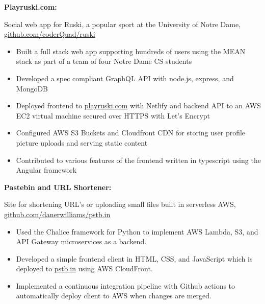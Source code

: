 \documentclass[letterpaper,10pt]{article}
\newcommand{\resumeItem}[2]{
  \item\small{
    {#1}{#2 \vspace{-2pt}}
  }
}
\newcommand{\resumeSubItem}[2]{\resumeItem{#1}{#2}\vspace{-4pt}}
\begin{document}
{     \resumeSubItem{\textbf{Playruski.com: }}
     { Social web app for Ruski, a popular sport at the University of Notre Dame, \href{https://github.com/coderQuad/ruski}{github.com/coderQuad/ruski}
        \vspace{-5pt}
        \begin{itemize}
            \item Built a full stack web app supporting hundreds of users using the MEAN stack as part of a team of four Notre Dame CS students
            \vspace{-2pt}
            \item Developed a spec compliant GraphQL API with node.js, express, and MongoDB
            \vspace{-2pt}
            \item Deployed frontend to \href{https://www.playruski.com}{playruski.com} with Netlify and backend API to an AWS EC2 virtual machine secured over HTTPS with Let's Encrypt
            \vspace{-2pt}
            \item Configured AWS S3 Buckets and Cloudfront CDN for storing user profile picture uploads and serving static content
            \vspace{-2pt}
            \item Contributed to various features of the frontend written in typescript using the Angular framework
        \end{itemize}
     } 

     \vspace{-2pt}

      \resumeSubItem{\textbf{Pastebin and URL Shortener: }}
      { Site for shortening URL's or uploading small files built in serverless AWS, \href{https://github.com/danerwilliams/pstb.in}{github.com/danerwilliams/pstb.in}
         \vspace{-5pt}
         \begin{itemize}
            \item Used the Chalice framework for Python to implement AWS Lambda, S3, and API Gateway microservices as a backend.
            \vspace{-2pt}
            \item Developed a simple frontend client in HTML, CSS, and JavaScript which is deployed to \href{https://www.pstb.in}{pstb.in} using AWS CloudFront.
            \vspace{-2pt}
            \item Implemented a continuous integration pipeline with Github actions to automatically deploy client to AWS when changes are merged.
         \end{itemize}
      }

}
\end{document}
